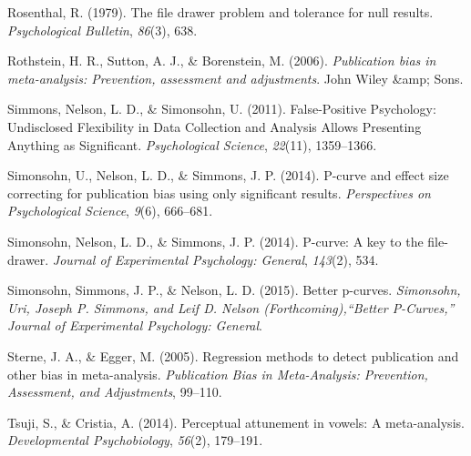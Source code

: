 \documentclass[american,floatsintext,man]{apa6}
\begin{document}
Rosenthal, R. (1979). The file drawer problem and tolerance for null
results. \emph{Psychological Bulletin}, \emph{86}(3), 638.

Rothstein, H. R., Sutton, A. J., \& Borenstein, M. (2006).
\emph{Publication bias in meta-analysis: Prevention, assessment and
adjustments}. John Wiley \&amp; Sons.

Simmons, Nelson, L. D., \& Simonsohn, U. (2011). False-Positive
Psychology: Undisclosed Flexibility in Data Collection and Analysis
Allows Presenting Anything as Significant. \emph{Psychological Science},
\emph{22}(11), 1359--1366.

Simonsohn, U., Nelson, L. D., \& Simmons, J. P. (2014). P-curve and
effect size correcting for publication bias using only significant
results. \emph{Perspectives on Psychological Science}, \emph{9}(6),
666--681.

Simonsohn, Nelson, L. D., \& Simmons, J. P. (2014). P-curve: A key to
the file-drawer. \emph{Journal of Experimental Psychology: General},
\emph{143}(2), 534.

Simonsohn, Simmons, J. P., \& Nelson, L. D. (2015). Better p-curves.
\emph{Simonsohn, Uri, Joseph P. Simmons, and Leif D. Nelson
(Forthcoming),``Better P-Curves,'' Journal of Experimental Psychology:
General}.

Sterne, J. A., \& Egger, M. (2005). Regression methods to detect
publication and other bias in meta-analysis. \emph{Publication Bias in
Meta-Analysis: Prevention, Assessment, and Adjustments}, 99--110.

Tsuji, S., \& Cristia, A. (2014). Perceptual attunement in vowels: A
meta-analysis. \emph{Developmental Psychobiology}, \emph{56}(2),
179--191.
\end{document}

